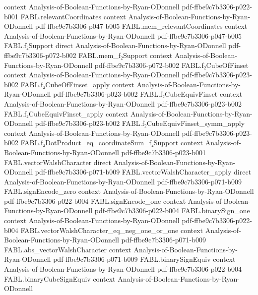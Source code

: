 \begin{theorem}
  {context}
  {Analysis-of-Boolean-Functions-by-Ryan-ODonnell}
  {pdf-ffbe9c7b3306-p022-b001}
\proofstep
  {FABL.relevantCoordinates}
  {context}
  {Analysis-of-Boolean-Functions-by-Ryan-ODonnell}
  {pdf-ffbe9c7b3306-p047-b005}
\proofstep
  {FABL.mem_relevantCoordinates}
  {context}
  {Analysis-of-Boolean-Functions-by-Ryan-ODonnell}
  {pdf-ffbe9c7b3306-p047-b005}
\proofstep
  {FABL.f₂Support}
  {direct}
  {Analysis-of-Boolean-Functions-by-Ryan-ODonnell}
  {pdf-ffbe9c7b3306-p072-b002}
\proofstep
  {FABL.mem_f₂Support}
  {context}
  {Analysis-of-Boolean-Functions-by-Ryan-ODonnell}
  {pdf-ffbe9c7b3306-p072-b002}
\proofstep
  {FABL.f₂CubeOfFinset}
  {context}
  {Analysis-of-Boolean-Functions-by-Ryan-ODonnell}
  {pdf-ffbe9c7b3306-p023-b002}
\proofstep
  {FABL.f₂CubeOfFinset_apply}
  {context}
  {Analysis-of-Boolean-Functions-by-Ryan-ODonnell}
  {pdf-ffbe9c7b3306-p023-b002}
\proofstep
  {FABL.f₂CubeEquivFinset}
  {context}
  {Analysis-of-Boolean-Functions-by-Ryan-ODonnell}
  {pdf-ffbe9c7b3306-p023-b002}
\proofstep
  {FABL.f₂CubeEquivFinset_apply}
  {context}
  {Analysis-of-Boolean-Functions-by-Ryan-ODonnell}
  {pdf-ffbe9c7b3306-p023-b002}
\proofstep
  {FABL.f₂CubeEquivFinset_symm_apply}
  {context}
  {Analysis-of-Boolean-Functions-by-Ryan-ODonnell}
  {pdf-ffbe9c7b3306-p023-b002}
\proofstep
  {FABL.f₂DotProduct_eq_coordinateSum_f₂Support}
  {context}
  {Analysis-of-Boolean-Functions-by-Ryan-ODonnell}
  {pdf-ffbe9c7b3306-p023-b001}
\proofstep
  {FABL.vectorWalshCharacter}
  {direct}
  {Analysis-of-Boolean-Functions-by-Ryan-ODonnell}
  {pdf-ffbe9c7b3306-p071-b009}
\proofstep
  {FABL.vectorWalshCharacter_apply}
  {direct}
  {Analysis-of-Boolean-Functions-by-Ryan-ODonnell}
  {pdf-ffbe9c7b3306-p071-b009}
\proofstep
  {FABL.signEncode_zero}
  {context}
  {Analysis-of-Boolean-Functions-by-Ryan-ODonnell}
  {pdf-ffbe9c7b3306-p022-b004}
\proofstep
  {FABL.signEncode_one}
  {context}
  {Analysis-of-Boolean-Functions-by-Ryan-ODonnell}
  {pdf-ffbe9c7b3306-p022-b004}
\proofstep
  {FABL.binarySign_one}
  {context}
  {Analysis-of-Boolean-Functions-by-Ryan-ODonnell}
  {pdf-ffbe9c7b3306-p022-b004}
\proofstep
  {FABL.vectorWalshCharacter_eq_neg_one_or_one}
  {context}
  {Analysis-of-Boolean-Functions-by-Ryan-ODonnell}
  {pdf-ffbe9c7b3306-p071-b009}
\proofstep
  {FABL.abs_vectorWalshCharacter}
  {context}
  {Analysis-of-Boolean-Functions-by-Ryan-ODonnell}
  {pdf-ffbe9c7b3306-p071-b009}
\proofstep
  {FABL.binarySignEquiv}
  {context}
  {Analysis-of-Boolean-Functions-by-Ryan-ODonnell}
  {pdf-ffbe9c7b3306-p022-b004}
\proofstep
  {FABL.binaryCubeSignEquiv}
  {context}
  {Analysis-of-Boolean-Functions-by-Ryan-ODonnell}

\end{theorem}
